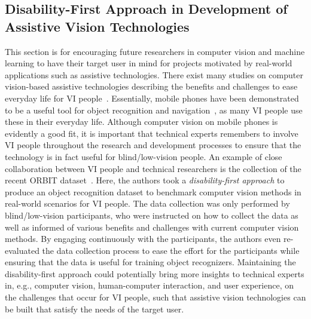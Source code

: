\subsection{Disability-First Approach in Development of Assistive Vision Technologies}

This section is for encouraging future researchers in computer vision and machine learning to have their target user in mind for projects motivated by real-world applications such as assistive technologies.
There exist many studies on computer vision-based assistive technologies describing the benefits and challenges to ease everyday life for VI people~\cite{jayant2011supporting, tian2013toward, leo2017computer, tapu2020wearable, wang2019implications}. Essentially, mobile phones have been demonstrated to be a useful tool for object recognition and navigation~\cite{jayant2011supporting, vazquez2012helping, szpiro2016finding, gurari2018vizwiz}, as many VI people use these in their everyday life. 
Although computer vision on mobile phones is evidently a good fit, it is important that technical experts remembers to involve VI people throughout the research and development processes to ensure that the technology is in fact useful for blind/low-vision people. 
An example of close collaboration between VI people and technical researchers is the collection of the recent ORBIT dataset~\cite{massiceti2021orbit, theodorou2021disability}. Here, the authors took a \textit{disability-first approach} to produce an object recognition dataset to benchmark computer vision methods in real-world scenarios for VI people. The data collection was only performed by blind/low-vision participants, who were instructed on how to collect the data as well as informed of various benefits and challenges with current computer vision methods. By engaging continuously with the participants, the authors even re-evaluated the data collection process to ease the effort for the participants while ensuring that the data is useful for training object recognizers. 
Maintaining the disability-first approach could potentially bring more insights to technical experts in, e.g., computer vision, human-computer interaction, and user experience, on the challenges that occur for VI people, such that assistive vision technologies can be built that satisfy the needs of the target user. 

